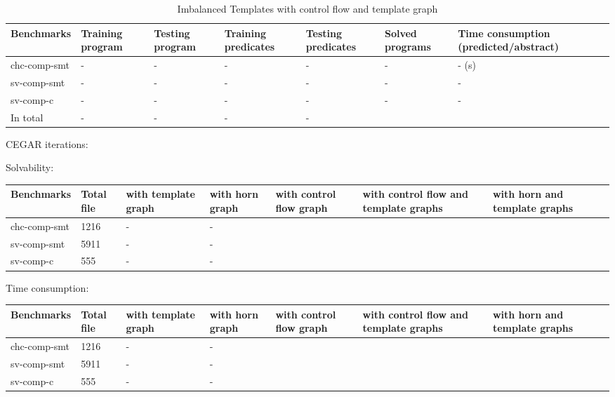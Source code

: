 \documentclass{article}
\begin{document}
\begin{table}[h]
\begin{center}\caption{Imbalanced Templates with control flow and template graph}
\begin{tabular}{lp{1.5cm}p{2cm}p{2cm}p{1.5cm}p{1.5cm}p{2.5cm}}
\hline
Benchmarks  & Training program &Testing program&Training  predicates & Testing predicates & Solved programs & Time consumption (predicted/abstract)\\
\hline
chc-comp-smt  &- &- &- & - & - & - (s)\\
sv-comp-smt  &-&-&-&-&-&-\\
sv-comp-c  &- &- & - &-&-&-\\
In total &-&-&-&-\\
\hline
\end{tabular}
\end{center}
\end{table}






CEGAR iterations:

Solvability:
\begin{center}
\begin{tabular}{lp{1cm}p{1cm}p{1cm}p{1cm}p{1cm}p{1cm}p{1cm} }
\hline
Benchmarks  & Total file & with template graph & with horn graph & with control flow graph &with control flow and template graphs & with horn and template graphs\\
\hline
chc-comp-smt & 1216 & -&-\\
sv-comp-smt & 5911 & -&-\\
sv-comp-c  & 555 & -&-\\
\hline
\end{tabular}
\end{center}

Time consumption:
\begin{center}
\begin{tabular}{lp{1cm}p{1cm}p{1cm}p{1cm}p{1cm}p{1cm}p{1cm} }
\hline
Benchmarks  & Total file & with template graph & with horn graph & with control flow graph &with control flow and template graphs & with horn and template graphs\\
\hline
chc-comp-smt  & 1216 & -&-\\
sv-comp-smt  & 5911 & -&-\\
sv-comp-c  & 555 & -&-\\
\hline
\end{tabular}
\end{center}
\end{document}
